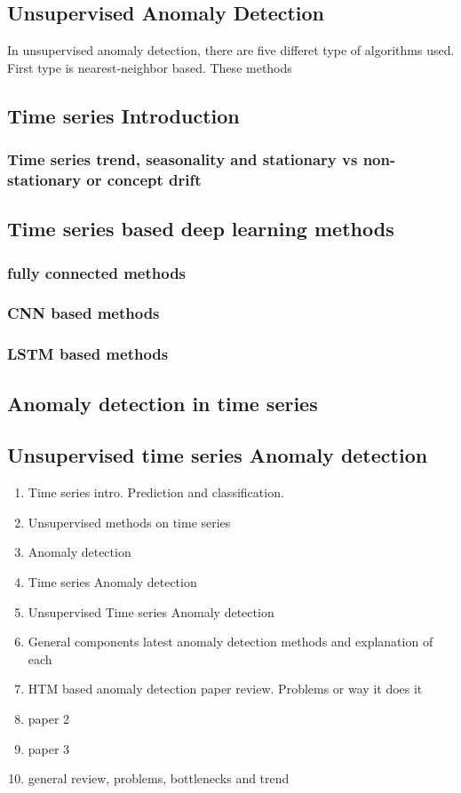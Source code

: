 \documentclass[12pt]{article}
\begin{document}
\subsection{Unsupervised Anomaly Detection}
In unsupervised anomaly detection, there are five differet type of algorithms used. First type is nearest-neighbor based. These methods 
\subsection{Time series Introduction}
\subsubsection{Time series trend, seasonality and stationary vs non-stationary or concept drift}
\subsection{Time series based deep learning methods}
\subsubsection{fully connected methods}
\subsubsection{CNN based methods}
\subsubsection{LSTM based methods}
\subsection{Anomaly detection in time series}
\subsection{Unsupervised time series Anomaly detection}
\begin{enumerate}
	\item Time series intro. Prediction and classification.
	\item Unsupervised methods on time series 
	\item Anomaly detection
	\item Time series Anomaly detection
	\item Unsupervised Time series Anomaly detection
	\item General components latest anomaly detection methods and explanation of each
	\item HTM based anomaly detection paper review. Problems or way it does it
	\item paper 2
	\item paper 3
	\item general review, problems, bottlenecks and trend
\end{enumerate}
\end{document}
